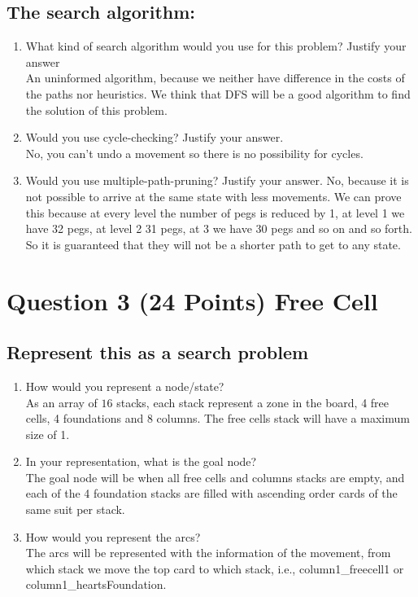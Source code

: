 \documentclass{article}
\def\ans#1{{\color{ans}#1}}
\begin{document}
\subsection{The search algorithm:}
\begin{enumerate}[label=(\alph*)]
    \item What kind of search algorithm would you use for this problem? Justify your answer \\
    \ans{
        An uninformed algorithm, because we neither have difference in the costs of the paths
        nor heuristics. We think that DFS will be a good algorithm to find the solution of this 
        problem.
    }
    \item Would you use cycle-checking? Justify your answer. \\
    \ans{
        No, you can't undo a movement so there is no possibility for cycles.
    }
    \item Would you use multiple-path-pruning? Justify your answer.
    \ans{
        No, because it is not possible to arrive at the same state with less movements. 
        We can prove this because at every level the number of pegs is reduced by 1, at 
        level 1 we have 32 pegs, at level 2 31 pegs, at 3 we have 30 pegs and so on and 
        so forth. So it is guaranteed that they will not be a shorter path to get to any 
        state.
    }
\end{enumerate}


\clearpage
\section{Question 3 (24 Points) Free Cell }

\subsection{Represent this as a search problem}
\begin{enumerate}[label=(\alph*)]
    \item How would you represent a node/state? \\
    \ans{
        As an array of $16$ stacks, each stack represent a zone in the board, 4 free cells, 4 foundations 
        and 8 columns. The free cells stack will have a maximum size of 1.
    }
    \item In your representation, what is the goal node? \\
    \ans{
        The goal node will be when all free cells and columns stacks are empty, and each of the 4 foundation 
        stacks are filled with ascending order cards of the same suit per stack.
    }
    \item How would you represent the arcs? \\
    \ans{
        The arcs will be represented with the information of the movement, from which stack we move the 
        top card to which stack, i.e., column1\_freecell1 or column1\_heartsFoundation.
    }
\end{enumerate}
\end{document}
